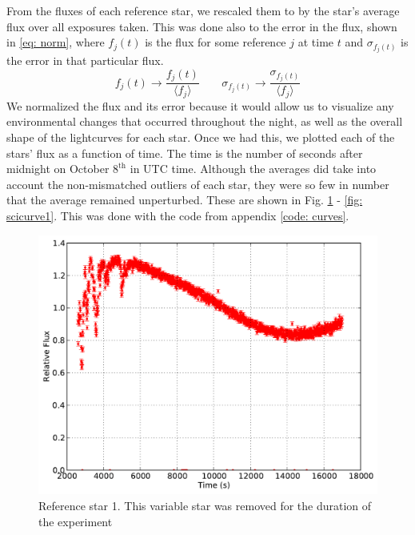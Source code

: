 \documentclass{aastex61}
\begin{document}
From the fluxes of each reference star, we rescaled them to by the star's average flux over all exposures taken. This was done also to the error in the flux, shown in \eqref{eq: norm}, where $f_{j}(t)$ is the flux for some reference $j$ at time $t$ and $\sigma_{f_{j}(t)}$ is the error in that particular flux.
\begin{equation} \label{eq: norm}
f_{j}(t)  \rightarrow \frac{f_{j}(t)}{\langle f_{j} \rangle}       \;\;\;\;\;\;\;\sigma_{f_{j}(t)} \rightarrow \frac{\sigma_{f_{j}(t)}}{\langle f_{j} \rangle}
\end{equation}
We normalized the flux and its error because it would allow us to visualize any environmental changes that occurred throughout the night, as well as the overall shape of the lightcurves for each star. Once we had this, we plotted each of the stars' flux as a function of time. The time is the number of seconds after midnight on October $8^{\text{th}}$ in UTC time. Although the averages did take into account the non-mismatched outliers of each star, they were so few in number that the average remained unperturbed. These are shown in Fig. \ref{fig: refcurve1} - \ref{fig: scicurve1}. This was done with the code from appendix \ref{code: curves}. 
\begin{figure}[hbt!]
	\centering
	\includegraphics[scale = .30]{exo_curves1.pdf}
    \caption{Reference star 1. This variable star was removed for the duration of the experiment}
    \label{fig: refcurve1}
\end{figure}
\end{document}

